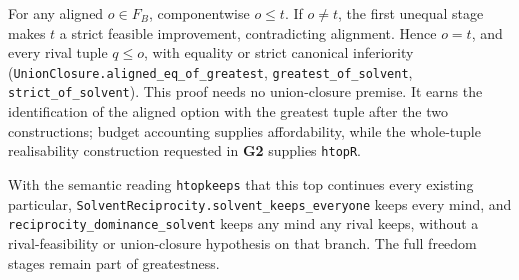 \documentclass[
]{article}
\begin{document}
For any aligned \(o\in F_B\), componentwise \(o\le t\). If \(o\ne t\),
the first unequal stage makes \(t\) a strict feasible improvement,
contradicting alignment. Hence \(o=t\), and every rival tuple
\(q\le o\), with equality or strict canonical inferiority
(\texttt{U\allowbreak{}n\allowbreak{}i\allowbreak{}o\allowbreak{}n\allowbreak{}C\allowbreak{}l\allowbreak{}o\allowbreak{}s\allowbreak{}u\allowbreak{}r\allowbreak{}e\allowbreak{}.\allowbreak{}a\allowbreak{}l\allowbreak{}i\allowbreak{}g\allowbreak{}n\allowbreak{}e\allowbreak{}d\allowbreak{}\_\allowbreak{}e\allowbreak{}q\allowbreak{}\_\allowbreak{}o\allowbreak{}f\allowbreak{}\_\allowbreak{}g\allowbreak{}r\allowbreak{}e\allowbreak{}a\allowbreak{}t\allowbreak{}e\allowbreak{}s\allowbreak{}t},
\texttt{g\allowbreak{}r\allowbreak{}e\allowbreak{}a\allowbreak{}t\allowbreak{}e\allowbreak{}s\allowbreak{}t\allowbreak{}\_\allowbreak{}o\allowbreak{}f\allowbreak{}\_\allowbreak{}s\allowbreak{}o\allowbreak{}l\allowbreak{}v\allowbreak{}e\allowbreak{}n\allowbreak{}t},
\texttt{s\allowbreak{}t\allowbreak{}r\allowbreak{}i\allowbreak{}c\allowbreak{}t\allowbreak{}\_\allowbreak{}o\allowbreak{}f\allowbreak{}\_\allowbreak{}s\allowbreak{}o\allowbreak{}l\allowbreak{}v\allowbreak{}e\allowbreak{}n\allowbreak{}t}).
This proof needs no union-closure premise. It earns the identification
of the aligned option with the greatest tuple after the two
constructions; budget accounting supplies affordability, while the
whole-tuple realisability construction requested in \textbf{G2} supplies
\texttt{htopR}.

With the semantic reading \texttt{htopkeeps} that this top continues
every existing particular,
\texttt{S\allowbreak{}o\allowbreak{}l\allowbreak{}v\allowbreak{}e\allowbreak{}n\allowbreak{}t\allowbreak{}R\allowbreak{}e\allowbreak{}c\allowbreak{}i\allowbreak{}p\allowbreak{}r\allowbreak{}o\allowbreak{}c\allowbreak{}i\allowbreak{}t\allowbreak{}y\allowbreak{}.\allowbreak{}s\allowbreak{}o\allowbreak{}l\allowbreak{}v\allowbreak{}e\allowbreak{}n\allowbreak{}t\allowbreak{}\_\allowbreak{}k\allowbreak{}e\allowbreak{}e\allowbreak{}p\allowbreak{}s\allowbreak{}\_\allowbreak{}e\allowbreak{}v\allowbreak{}e\allowbreak{}r\allowbreak{}y\allowbreak{}o\allowbreak{}n\allowbreak{}e}
keeps every mind, and
\texttt{r\allowbreak{}e\allowbreak{}c\allowbreak{}i\allowbreak{}p\allowbreak{}r\allowbreak{}o\allowbreak{}c\allowbreak{}i\allowbreak{}t\allowbreak{}y\allowbreak{}\_\allowbreak{}d\allowbreak{}o\allowbreak{}m\allowbreak{}i\allowbreak{}n\allowbreak{}a\allowbreak{}n\allowbreak{}c\allowbreak{}e\allowbreak{}\_\allowbreak{}s\allowbreak{}o\allowbreak{}l\allowbreak{}v\allowbreak{}e\allowbreak{}n\allowbreak{}t}
keeps any mind any rival keeps, without a rival-feasibility or
union-closure hypothesis on that branch. The full freedom stages remain
part of greatestness.
\end{document}
